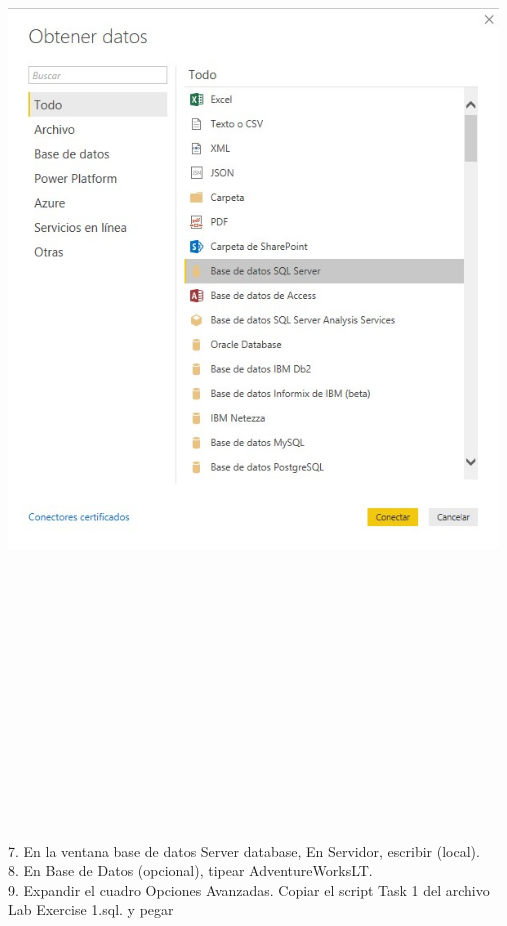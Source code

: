 \documentclass[12pt,letterpaper]{article}
\begin{document}
\begin{flushleft}
\begin{itemize}
\textbf{ }\\
\begin{center}
	\includegraphics[width=13cm]{./Imagenes/image3} 
	\end{center}
\textbf{ }\\
\textbf{ }\\
\textbf{ }\\
\textbf{ }\\
\textbf{ }\\
\textbf{ }\\
\textbf{ }\\
\textbf{ }\\
\textbf{ }\\
\textbf{ }\\
\textbf{ }\\
\textbf{ }\\
\textbf{ }\\
\textbf{ }\\
7. En la ventana base de datos Server database, En Servidor, escribir (local).\\
8. En Base de Datos (opcional), tipear AdventureWorksLT.\\
9. Expandir el cuadro Opciones Avanzadas. Copiar el script Task 1 del archivo Lab Exercise 1.sql. y pegar\\

\end{itemize}
\end{flushleft}
\end{document}

